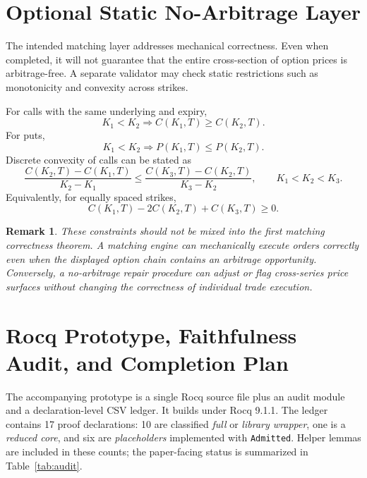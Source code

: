 \documentclass[11pt]{article}
\newtheorem{remark}[definition]{Remark}
\begin{document}
\section{Optional Static No-Arbitrage Layer}\label{sec:noarb}

The intended matching layer addresses mechanical correctness. Even when completed, it will not guarantee that the entire cross-section of option prices is arbitrage-free. A separate validator may check static restrictions such as monotonicity and convexity across strikes.

For calls with the same underlying and expiry,
\[
K_1<K_2
\Longrightarrow
C(K_1,T)\ge C(K_2,T).
\]
For puts,
\[
K_1<K_2
\Longrightarrow
P(K_1,T)\le P(K_2,T).
\]
Discrete convexity of calls can be stated as
\[
\frac{C(K_2,T)-C(K_1,T)}{K_2-K_1}
\le
\frac{C(K_3,T)-C(K_2,T)}{K_3-K_2},
\qquad K_1<K_2<K_3.
\]
Equivalently, for equally spaced strikes,
\[
C(K_1,T)-2C(K_2,T)+C(K_3,T)\ge0.
\]

\begin{remark}
These constraints should not be mixed into the first matching correctness theorem. A matching engine can mechanically execute orders correctly even when the displayed option chain contains an arbitrage opportunity. Conversely, a no-arbitrage repair procedure can adjust or flag cross-series price surfaces without changing the correctness of individual trade execution.
\end{remark}

\section{Rocq Prototype, Faithfulness Audit, and Completion Plan}\label{sec:audit}

The accompanying prototype is a single Rocq source file plus an audit module and a declaration-level CSV ledger. It builds under Rocq 9.1.1. The ledger contains 17 proof declarations: 10 are classified \emph{full} or \emph{library wrapper}, one is a \emph{reduced core}, and six are \emph{placeholders} implemented with \texttt{Admitted}. Helper lemmas are included in these counts; the paper-facing status is summarized in Table~\ref{tab:audit}.
\end{document}
